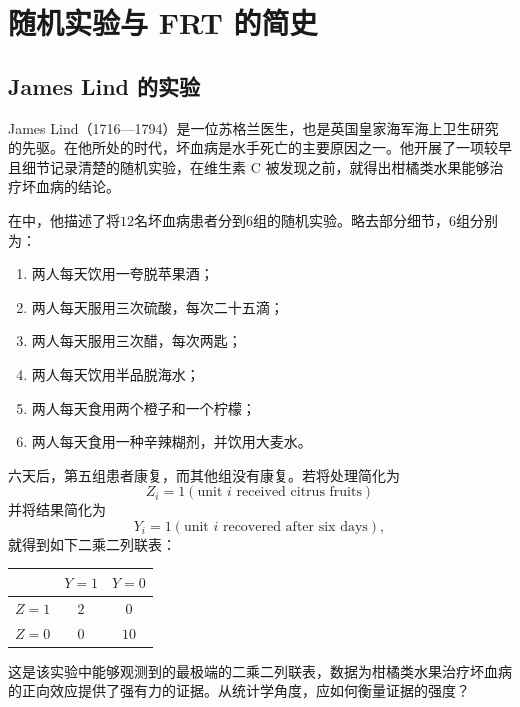 \section{随机实验与 FRT 的简史}


\subsection{James Lind 的实验}\label{section::lind}


James Lind（1716—1794）是一位苏格兰医生，也是英国皇家海军海上卫生研究的先驱。在他所处的时代，坏血病是水手死亡的主要原因之一。他开展了一项较早且细节记录清楚的随机实验，在维生素 C 被发现之前，就得出柑橘类水果能够治疗坏血病的结论。 


在\citet{lind1753treatise}中，他描述了将$12$名坏血病患者分到$6$组的随机实验。略去部分细节，$6$组分别为：
\begin{enumerate}
[(1)]
\item
两人每天饮用一夸脱苹果酒； 

\item
两人每天服用三次硫酸，每次二十五滴；

\item
两人每天服用三次醋，每次两匙；

\item
两人每天饮用半品脱海水；


\item
两人每天食用两个橙子和一个柠檬；

\item 
两人每天食用一种辛辣糊剂，并饮用大麦水。
\end{enumerate}

六天后，第五组患者康复，而其他组没有康复。若将处理简化为
$$
Z_i  = 1(\text{unit } i \text{ received citrus fruits})
$$
并将结果简化为
$$
Y_i = 1(\text{unit } i \text{ recovered after six days}),
$$
就得到如下二乘二列联表：

\begin{center}
\begin{tabular}{lcc}
\hline 
      & $Y =1$ & $Y =0$\\\hline
$Z =1$ & $2$ & $0$\\ 
$Z =0$ & $0$ & $10$\\
\hline 
\end{tabular}
\end{center}


这是该实验中能够观测到的最极端的二乘二列联表，数据为柑橘类水果治疗坏血病的正向效应提供了强有力的证据。从统计学角度，应如何衡量证据的强度？


